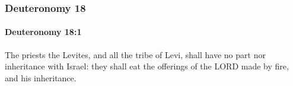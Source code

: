 	\subsubsection{Deuteronomy 18} %
		\label{DEUTERONOMY-18}

		\paragraph{Deuteronomy 18:1} %
			\label{DEUTERONOMY-18-1}

			The priests the Levites, and all the tribe of Levi, shall have no part nor inheritance with Israel: they shall eat the offerings of the LORD made by fire, and his inheritance.


